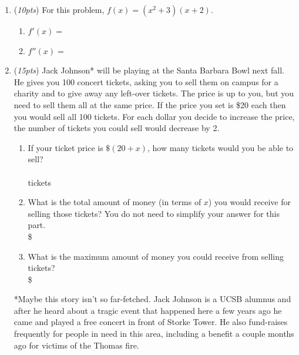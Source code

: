 \documentclass[12pt]{article}
\newcommand{\ansbox}[2]{\raisebox{-.5\height}{\framebox(#1,#2){}}}
\begin{document}
\begin{enumerate}
    
    

\item ({\it 10pts}) For this problem, $f(x) = (x^2+3)(x+2).$ \vspace{20pt}
\begin{enumerate} 
\vfill
\item $f'(x)=$\phantom{.} \ansbox{400}{70} \vspace{20pt} %
\vfill
\item $f''(x)=$ \ansbox{400}{70} \vspace{20pt} %
\end{enumerate}




	
	
    
    
\newpage
\item ({\it 15pts}) Jack Johnson* will be playing at the Santa Barbara Bowl next fall. He gives you 100 concert tickets, asking you to sell them on campus for a charity and to give away any left-over tickets. The price is up to you, but you need to sell them all at the same price. If the price you set is \$20 each then you would sell all 100 tickets. For each dollar you decide to increase the price, the number of tickets you could sell would decrease by 2. 
\begin{enumerate}
\item If your ticket price is
$\$(20 + x)$, how many tickets would you be able to sell? \\ 
\vspace{30pt} \\
\phantom{.} \hfill  \ansbox{150}{50} tickets
\item What is the total amount of
money (in terms of $x$) you would receive for selling those tickets? You do not need to simplify your answer for this part. \\ 
\vfill
\phantom{.} \hfill {\Large \$} \ \ansbox{350}{50} 
\item What is the maximum amount of money you could receive from selling tickets? \\ 
\vfill
\vfill
\vfill
\phantom{.} \hfill {\Large \$} \ \ansbox{80}{50} 
\end{enumerate}
\scriptsize{*Maybe this story isn't so far-fetched. Jack Johnson is a UCSB alumnus and after he heard about a tragic event that happened here a few years ago he came and played a free concert in front of Storke Tower. He also fund-raises frequently for people in need in this area, including a benefit a couple months ago for victims of the Thomas fire.} 















\end{enumerate}
\end{document}

